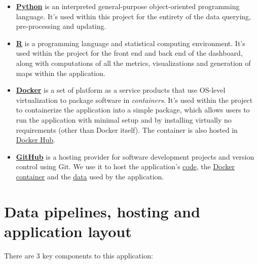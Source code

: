 \documentclass[
  a4paper]{article}
\begin{document}
\begin{itemize}
\item
  \href{https://www.python.org/}{\textbf{Python}} is an interpreted
  general-purpose object-oriented programming language. It's used within
  this project for the entirety of the data querying, pre-processing and
  updating.
\item
  \href{https://www.r-project.org/}{\textbf{R}} is a programming
  language and statistical computing environment. It's used within the
  project for the front end and back end of the dashboard, along with
  computations of all the metrics, visualizations and generation of maps
  within the application.
\item
  \href{https://www.docker.com/}{\textbf{Docker}} is a set of platform
  as a service products that use OS-level virtualization to package
  software in \emph{containers}. It's used within the project to
  containerize the application into a simple package, which allows users
  to run the application with minimal setup and by installing virtually
  no requirements (other than Docker itself). The container is also
  hosted in \href{https://hub.docker.com/r/dreth/tfm_uc3m}{Docker Hub}.
\item
  \href{https://github.com}{\textbf{GitHub}} is a hosting provider for
  software development projects and version control using Git. We use it
  to host the application's
  \href{https://github.com/dreth/tfm_uc3m}{code}, the
  \href{https://github.com/dreth/tfm_uc3m/pkgs/container/tfm_uc3m}{Docker
  container} and the \href{https://github/tfm_uc3m_data}{data} used by
  the application.
\end{itemize}

\hypertarget{data-pipelines-hosting-and-application-layout}{%
\section{Data pipelines, hosting and application
layout}\label{data-pipelines-hosting-and-application-layout}}

There are 3 key components to this application:
\end{document}

